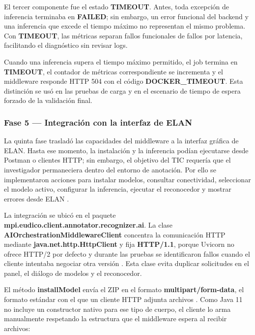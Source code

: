 El tercer componente fue el estado \textbf{TIMEOUT}. Antes, toda excepción de inferencia terminaba en \textbf{FAILED}; sin embargo, un error funcional del backend y una inferencia que excede el tiempo máximo no representan el mismo problema. Con \textbf{TIMEOUT}, las métricas separan fallos funcionales de fallos por latencia, facilitando el diagnóstico sin revisar logs.

Cuando una inferencia supera el tiempo máximo permitido, el job termina en \textbf{TIMEOUT}, el contador de métricas correspondiente se incrementa y el middleware responde HTTP 504 con el código \textbf{DOCKER\_TIMEOUT}. Esta distinción se usó en las pruebas de carga y en el escenario de tiempo de espera forzado de la validación final.

\subsubsection{Fase 5 — Integración con la interfaz de ELAN}

La quinta fase trasladó las capacidades del middleware a la interfaz gráfica de ELAN. Hasta ese momento, la instalación y la inferencia podían ejecutarse desde Postman o clientes HTTP; sin embargo, el objetivo del TIC requería que el investigador permaneciera dentro del entorno de anotación. Por ello se implementaron acciones para instalar modelos, consultar conectividad, seleccionar el modelo activo, configurar la inferencia, ejecutar el reconocedor y mostrar errores desde ELAN \cite{auer2014avatech}.

La integración se ubicó en el paquete \textbf{mpi.\allowbreak{}eudico.\allowbreak{}client.\allowbreak{}annotator.\allowbreak{}recognizer.\allowbreak{}ai}. La clase \textbf{AIOrchestration\allowbreak{}MiddlewareClient} concentra la comunicación HTTP mediante \textbf{java.net.http.\allowbreak{}HttpClient} y fija \textbf{HTTP/1.1}, porque Uvicorn no ofrece HTTP/2 por defecto y durante las pruebas se identificaron fallos cuando el cliente intentaba negociar otra versión \cite{java11_httpclient,uvicorn_docs}. Esta clase evita duplicar solicitudes en el panel, el diálogo de modelos y el reconocedor.

El método \textbf{installModel} envía el ZIP en el formato \textbf{multipart/form-data}, el formato estándar con el que un cliente HTTP adjunta archivos \cite{rfc7578}. Como Java 11 no incluye un constructor nativo para ese tipo de cuerpo, el cliente lo arma manualmente respetando la estructura que el middleware espera al recibir archivos:

